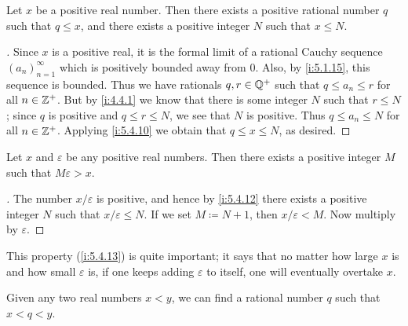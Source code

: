 \begin{prop}\label{i:5.4.12}
  Let \(x\) be a positive real number.
  Then there exists a positive rational number \(q\) such that \(q \leq x\), and there exists a positive integer \(N\) such that \(x \leq N\).
\end{prop}

\begin{proof}[]
  Since \(x\) is a positive real, it is the formal limit of a rational Cauchy sequence \((a_n)_{n = 1}^{\infty}\) which is positively bounded away from \(0\).
  Also, by \cref{i:5.1.15}, this sequence is bounded.
  Thus we have rationals \(q, r \in \mathbb{Q}^+\) such that \(q \leq a_n \leq r\) for all \(n \in \mathbb{Z}^+\).
  But by \cref{i:4.4.1} we know that there is some integer \(N\) such that \(r \leq N\);
  since \(q\) is positive and \(q \leq r \leq N\), we see that \(N\) is positive.
  Thus \(q \leq a_n \leq N\) for all \(n \in \mathbb{Z}^+\).
  Applying \cref{i:5.4.10} we obtain that \(q \leq x \leq N\), as desired.
\end{proof}

\begin{cor}\label{i:5.4.13}
  Let \(x\) and \(\varepsilon\) be any positive real numbers.
  Then there exists a positive integer \(M\) such that \(M\varepsilon > x\).
\end{cor}

\begin{proof}[]
  The number \(x / \varepsilon\) is positive, and hence by \cref{i:5.4.12} there exists a positive integer \(N\) such that \(x / \varepsilon \leq N\).
  If we set \(M \coloneqq N + 1\), then \(x / \varepsilon < M\).
  Now multiply by \(\varepsilon\).
\end{proof}

\begin{note}
  This property (\cref{i:5.4.13}) is quite important;
  it says that no matter how large \(x\) is and how small \(\varepsilon\) is, if one keeps adding \(\varepsilon\) to itself, one will eventually overtake \(x\).
\end{note}

\begin{prop}\label{i:5.4.14}
  Given any two real numbers \(x < y\), we can find a rational number \(q\) such that \(x < q < y\).
\end{prop}

